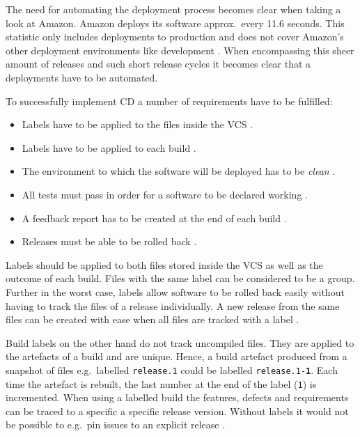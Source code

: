 The need for automating the deployment process becomes clear when taking a look
at Amazon. Amazon deploys its software approx.\ every 11.6 seconds. This
statistic only includes deployments to production and does not cover Amazon's
other deployment environments like development
\autocite{JenkinsVelocityCulture2011}. When encompassing this sheer amount of
releases and such short release cycles it becomes clear that a deployments have
to be automated.

To successfully implement \ac{CD} a number of requirements have to be
fulfilled: 
\begin{itemize}
  \item Labels have to be applied to the files inside the \ac{VCS}
    \autocite[pp. 191-194]{MatyasContinuousIntegration2007}.
  \item Labels have to be applied to each build \autocite[pp.
    195f.]{MatyasContinuousIntegration2007}.
  \item The environment to which the software will be deployed has to be
    \textit{clean} \autocite[pp. 194f.]{MatyasContinuousIntegration2007}.
  \item All tests must pass in order for a software to be declared working
    \autocite[p. 196]{MatyasContinuousIntegration2007}.
  \item A feedback report has to be created at the end of each build
    \autocite[pp. 196-198]{MatyasContinuousIntegration2007}.
  \item Releases must be able to be rolled back \autocite[p.
    199]{MatyasContinuousIntegration2007}.
\end{itemize}

Labels should be applied to both files stored inside the \ac{VCS} as well as
the outcome of each build. Files with the same label can be considered to be a
group. Further in the worst case, labels allow software to be rolled back
easily without having to track the files of a release individually. A new
release from the same files can be created with ease when all files are tracked
with a label \autocite[pp. 191-194]{MatyasContinuousIntegration2007}.

Build labels on the other hand do not track uncompiled files. They are applied
to the artefacts of a build and are unique. Hence, a build artefact produced
from a snapshot of files e.g.\ labelled \texttt{release.1}
could be labelled \texttt{release.1-\textbf{1}}. Each time
the artefact is rebuilt, the last number at the end of the label (\texttt{1})
is incremented. When using a labelled build the features, defects and
requirements can be traced to a specific a specific release version. Without
labels it would not be possible to e.g.\ pin issues to an explicit release
\autocite[pp. 195f.]{MatyasContinuousIntegration2007}.


